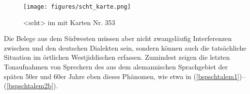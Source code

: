 {\begin{figure}
		\centering
\texttt{[image: figures/scht\_karte.png]}
		\caption{\label{kartescht} <scht> im  mit  Karten Nr. 353}
		\end{figure}


Die Belege aus dem Südwesten müssen aber nicht zwangsläufig Interferenzen zwischen \hai{{\LiJi}} und den deutschen Dialekten sein, sondern können auch die tatsächliche Situation im örtlichen Westjiddischen erfassen. Zumindest zeigen die letzten Tonaufnahmen von Sprechern des \hai{{\SWJ}} aus dem alemannischen Sprachgebiet der späten 50er und 60er Jahre eben dieses Phänomen, wie etwa in (\ref{bspschtalem1})–(\ref{bspschtalem2b}).

\largerpage
 
}
